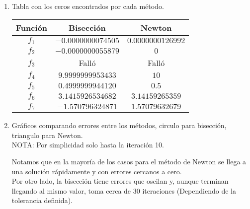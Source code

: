 \documentclass[spanish, fleqn]{article}
\begin{document}
\begin{enumerate}
		\item
			Tabla con los ceros encontrados por cada método.
			\begin{center}
				\begin{tabular}{|c|c|c|}
					\hline
					\textbf{Función} & \textbf{Bisección} & \textbf{Newton} \\
					\hline
					$f_1$	& $-0.0000000074505$ & $0.0000000126992$ \\
					\hline
					$f_2$	& $-0.0000000055879$ & $0$ \\
					\hline
					$f_3$	&  Falló & Falló \\
					\hline
					$f_4$	& $9.9999999953433$ & $10$ \\
					\hline
					$f_5$	& $0.4999999944120$ & $0.5$ \\
					\hline
					$f_6$	& $3.1415926534682$ & $3.14159265359$ \\
					\hline
					$f_7$	& $-1.570796324871$ & $1.57079632679$ \\
					\hline
				\end{tabular}
			\end{center}
		\item
			Gráficos comparando errores entre los métodos, circulo para 
			bisección, triangulo para Newton.\\
			NOTA: Por simplicidad solo hasta la iteración 10.
			
			Notamos que en la mayoría de los casos para el método de Newton
			se llega a una solución rápidamente y con errores cercanos a cero.
			\\ Por otro lado, la bisección tiene errores que oscilan y, aunque
			terminan llegando al mismo valor, toma cerca de 30 iteraciones 
			(Dependiendo de la tolerancia definida).
			

\end{enumerate}
\end{document}
